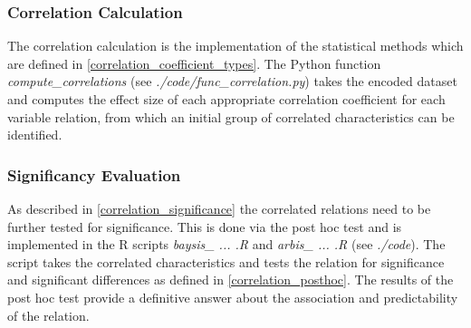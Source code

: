 \subsubsection{Correlation Calculation}
\label{methodology_correlation_processing_correlation}
The correlation calculation is the implementation of the statistical methods which are defined in \cref{correlation_coefficient_types}. The Python function \textit{compute\_correlations} (see \textit{./code/func\_correlation.py}) takes the encoded dataset and computes the effect size of each appropriate correlation coefficient for each variable relation, from which an initial group of correlated characteristics can be identified.

\subsubsection{Significancy Evaluation}
\label{methodology_correlation_processing_significanc}
As described in \cref{correlation_significance} the correlated relations need to be further tested for significance. This is done via the post hoc test and is implemented in the R scripts \textit{baysis\_ ... .R} and \textit{arbis\_ ... .R} (see \textit{./code}). The script takes the correlated characteristics and tests the relation for significance and significant differences as defined in \cref{correlation_posthoc}. The results of the post hoc test provide a definitive answer about the association and predictability of the relation.